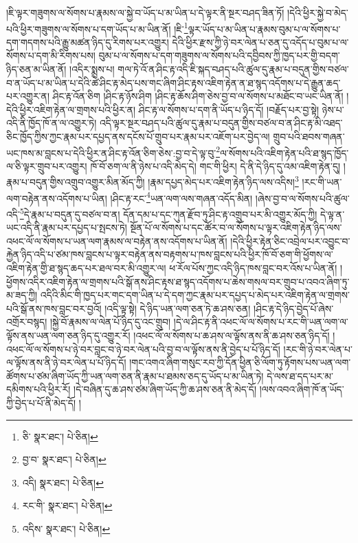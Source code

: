 །ཇི་ལྟར་གཟུགས་ལ་སོགས་པ་རྣམས་ལ་སྐྱེ་བ་ཡོད་པ་མ་ཡིན་པ་དེ་ལྟར་ནི་སྔར་བཤད་ཟིན་ཏོ། །དེའི་ཕྱིར་སྐྱེ་བ་མེད་པའི་ཕྱིར་གཟུགས་ལ་སོགས་པ་དག་ཡོད་པ་མ་ཡིན་ནོ། །ཇི་\footnote{ཅི་  སྣར་ཐང་།  པེ་ཅིན། }ལྟར་ཡོད་པ་མ་ཡིན་པ་རྣམས་བུམ་པ་ལ་སོགས་པ་དག་གདགས་པའི་རྒྱུ་མཚན་ཉིད་དུ་རིགས་པར་འགྱུར། དེའི་ཕྱིར་རྫས་ཀྱི་ཉེ་བར་ལེན་པ་ཅན་དུ་འདོད་པ་བུམ་པ་ལ་སོགས་པ་དག་མི་རིགས་པས། བུམ་པ་ལ་སོགས་པ་དག་གཟུགས་ལ་སོགས་པའི་དབྱིབས་ཀྱི་ཁྱད་པར་གྱི་བདག་ཉིད་ཅན་མ་ཡིན་ནོ། །འདིར་སྨྲས་པ། གལ་ཏེ་འོ་ན་ཤིང་རྟ་འདི་ཇི་སྐད་བཤད་པའི་ཚུལ་དུ་རྣམ་པ་བདུན་གྱིས་བཙལ་བ་ན་ཡོད་པ་མ་ཡིན་པ་དེའི་ཚེ་ཤིང་རྟ་མེད་པས་གང་ཞིག་ཤིང་རྟས་འཇིག་རྟེན་ན་ཐ་སྙད་འདོགས་པ་དེ་རྒྱུན་ཆད་པར་འགྱུར་ན། ཤིང་རྟ་འོན་ཅིག །ཤིང་རྟ་ཉོས་ཤིག །ཤིང་རྟ་ཆོས་ཤིག་ཅེས་བྱ་བ་ལ་སོགས་པ་མཐོང་བ་ཡང་ཡིན་ནོ། །དེའི་ཕྱིར་འཇིག་རྟེན་ལ་གྲགས་པའི་ཕྱིར་ན། ཤིང་རྟ་ལ་སོགས་པ་དག་ནི་ཡོད་པ་ཉིད་དོ། །བརྗོད་པར་བྱ་སྟེ། ཉེས་པ་འདི་ནི་ཁྱོད་ཁོ་ན་ལ་འགྱུར་ཏེ། འདི་ལྟར་སྔར་བཤད་པའི་ཚུལ་དུ་རྣམ་པ་བདུན་གྱིས་བཙལ་བ་ན་ཤིང་རྟ་མི་འཐད་ཅིང་ཁྱོད་ཀྱིས་ཀྱང་རྣམ་པར་དཔྱད་ནས་དངོས་པོ་གྲུབ་པར་རྣམ་པར་འཇོག་པར་བྱེད་ལ། གྲུབ་པའི་ཐབས་གཞན་ཡང་ཁས་མ་བླངས་པ་དེའི་ཕྱིར་ན་ཤིང་རྟ་འོན་ཅིག་ཅེས་:བྱ་བ་དེ་ལྟ་བུ་\footnote{བྱ་བ་  སྣར་ཐང་།  པེ་ཅིན། }ལ་སོགས་པའི་འཇིག་རྟེན་པའི་ཐ་སྙད་ཁྱོད་ལ་ཅི་ལྟར་གྲུབ་པར་འགྱུར། ཁོ་བོ་ཅག་ལ་ནི་ཉེས་པ་འདི་མེད་དེ། གང་གི་ཕྱིར། དེ་ནི་དེ་ཉིད་དུ་འམ་འཇིག་རྟེན་དུ། །རྣམ་པ་བདུན་གྱིས་འགྲུབ་འགྱུར་མིན་མོད་ཀྱི། །རྣམ་དཔྱད་མེད་པར་འཇིག་རྟེན་ཉིད་ལས་འདིས།\footnote{འདི།  སྣར་ཐང་།  པེ་ཅིན། } །རང་གི་ཡན་ལག་བརྟེན་ནས་འདོགས་པ་ཡིན། །ཤིང་རྟ་རང་\footnote{རང་གི་  སྣར་ཐང་།  པེ་ཅིན། }ཡན་ལག་ལས་གཞན་འདོད་མིན། །ཞེས་བྱ་བ་ལ་སོགས་པའི་ཚུལ་འདི་\footnote{འདིས་  སྣར་ཐང་།  པེ་ཅིན། }དེ་རྣམ་པ་བདུན་དུ་བཙལ་བ་ན། དོན་དམ་པ་དང་ཀུན་རྫོབ་ཏུ་ཤིང་རྟ་འགྲུབ་པར་མི་འགྱུར་མོད་ཀྱི། དེ་ལྟ་ན་ཡང་འདི་ནི་རྣམ་པར་དཔྱད་པ་སྤངས་ཏེ། སྔོན་པོ་ལ་སོགས་པ་དང་ཚོར་བ་ལ་སོགས་པ་ལྟར་འཇིག་རྟེན་ཉིད་ལས་འཕང་ལོ་ལ་སོགས་པ་ཡན་ལག་རྣམས་ལ་བརྟེན་ནས་འདོགས་པ་ཡིན་ནོ། །དེའི་ཕྱིར་རྟེན་ཅིང་འབྲེལ་པར་འབྱུང་བ་རྐྱེན་ཉིད་འདི་པ་ཙམ་ཁས་བླངས་པ་ལྟར་བརྟེན་ནས་བརྟགས་པ་ཁས་བླངས་པའི་ཕྱིར་ཁོ་བོ་ཅག་གི་ཕྱོགས་ལ་འཇིག་རྟེན་གྱི་ཐ་སྙད་ཆད་པར་ཐལ་བར་མི་འགྱུར་ལ། ཕ་རོལ་པོས་ཀྱང་འདི་ཉིད་ཁས་བླང་བར་འོས་པ་ཡིན་ནོ། །ཕྱོགས་འདིར་འཇིག་རྟེན་ལ་གྲགས་པའི་སྒོ་ནས་ཤིང་རྟས་ཐ་སྙད་འདོགས་པ་ཆེས་གསལ་བར་གྲུབ་པ་འབའ་ཞིག་ཏུ་མ་ཟད་ཀྱི། འདིའི་མིང་གི་ཁྱད་པར་གང་དག་ཡིན་པ་དེ་དག་ཀྱང་རྣམ་པར་དཔྱད་པ་མེད་པར་འཇིག་རྟེན་ལ་གྲགས་པའི་སྒོ་ནས་ཁས་བླང་བར་བྱའོ། །འདི་ལྟ་སྟེ། དེ་ཉིད་ཡན་ལག་ཅན་ཏེ་ཆ་ཤས་ཅན། །ཤིང་རྟ་དེ་ཉིད་བྱེད་པོ་ཞེས་འགྲོར་བསྙད། །སྐྱེ་བོ་རྣམས་ལ་ལེན་པོ་ཉིད་དུ་འང་གྲུབ། །དེ་ལ་ཤིང་རྟ་ནི་འཕང་ལོ་ལ་སོགས་པ་རང་གི་ཡན་ལག་ལ་ལྟོས་ནས་ཡན་ལག་ཅན་ཉིད་དུ་འགྱུར་རོ། །འཕང་ལོ་ལ་སོགས་པ་ཆ་ཤས་ལ་ལྟོས་ནས་ནི་ཆ་ཤས་ཅན་ཉིད་དོ། །འཕང་ལོ་ལ་སོགས་པ་ཉེ་བར་བླང་བ་ཉེ་བར་ལེན་པའི་བྱ་བ་ལ་ལྟོས་ནས་ནི་བྱེད་པ་པོ་ཉིད་དོ། །རང་གི་ཉེ་བར་ལེན་པ་ལ་ལྟོས་ནས་ནི་ཉེ་བར་ལེན་པ་པོ་ཉིད་དོ། །གང་འགའ་ཞིག་གསུང་རབ་ཀྱི་དོན་ཕྱིན་ཅི་ལོག་ཏུ་རྟོགས་པས་ཡན་ལག་ཚོགས་པ་ཙམ་ཞིག་ཡོད་ཀྱི་ཡན་ལག་ཅན་ནི་རྣམ་པ་ཐམས་ཅད་དུ་ཡོད་པ་མ་ཡིན་ཏེ། དེ་ལས་ཐ་དད་པར་མ་དམིགས་པའི་ཕྱིར་རོ། །དེ་བཞིན་དུ་ཆ་ཤས་ཙམ་ཞིག་ཡོད་ཀྱི་ཆ་ཤས་ཅན་ནི་མེད་དོ། །ལས་འབའ་ཞིག་ཁོ་ན་ཡོད་ཀྱི་བྱེད་པ་པོ་ནི་མེད་དོ། །
